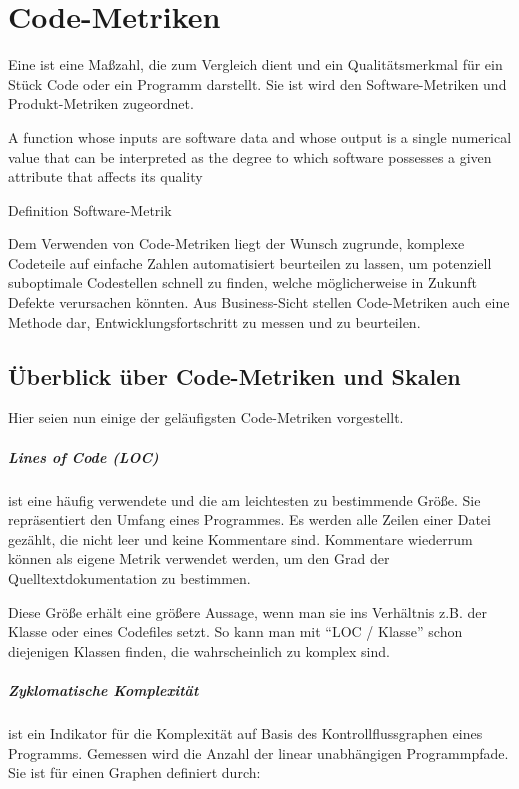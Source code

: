 \chapter{Code-Metriken}
\label{sec:metriken}
Eine  ist eine Maßzahl, die zum Vergleich dient und ein Qualitätsmerkmal für ein Stück Code oder ein Programm darstellt. Sie ist wird den Software-Metriken und Produkt-Metriken zugeordnet.

\epigraph{A function whose inputs are software data and whose output is a single
numerical value that can be interpreted as the degree to which software possesses a given attribute that affects its quality}{Definition Software-Metrik \citep{ieee_1998}}

Dem Verwenden von Code-Metriken liegt der Wunsch zugrunde, komplexe Codeteile auf einfache Zahlen automatisiert beurteilen zu lassen, um potenziell suboptimale Codestellen schnell zu finden, welche möglicherweise in Zukunft Defekte verursachen könnten. Aus Business-Sicht stellen Code-Metriken auch eine Methode dar, Entwicklungsfortschritt zu messen und zu beurteilen.
\section{Überblick über Code-Metriken und Skalen}
Hier seien nun einige der geläufigsten Code-Metriken vorgestellt.
\paragraph{Lines of Code (LOC)} ist eine häufig verwendete und die am leichtesten zu bestimmende Größe. Sie repräsentiert den Umfang eines Programmes. Es werden alle Zeilen einer Datei gezählt, die nicht leer und keine Kommentare sind. Kommentare wiederrum können als eigene Metrik verwendet werden, um den Grad der Quelltextdokumentation zu bestimmen.

Diese Größe erhält eine größere Aussage, wenn man sie ins Verhältnis z.B. der Klasse oder eines Codefiles setzt. So kann man mit "`LOC / Klasse"' schon diejenigen Klassen finden, die wahrscheinlich zu komplex sind. \\

\paragraph{Zyklomatische Komplexität} ist ein Indikator für die Komplexität auf Basis des Kontrollflussgraphen eines Programms. Gemessen wird die Anzahl der linear unabhängigen Programmpfade. Sie ist für einen Graphen definiert durch:

